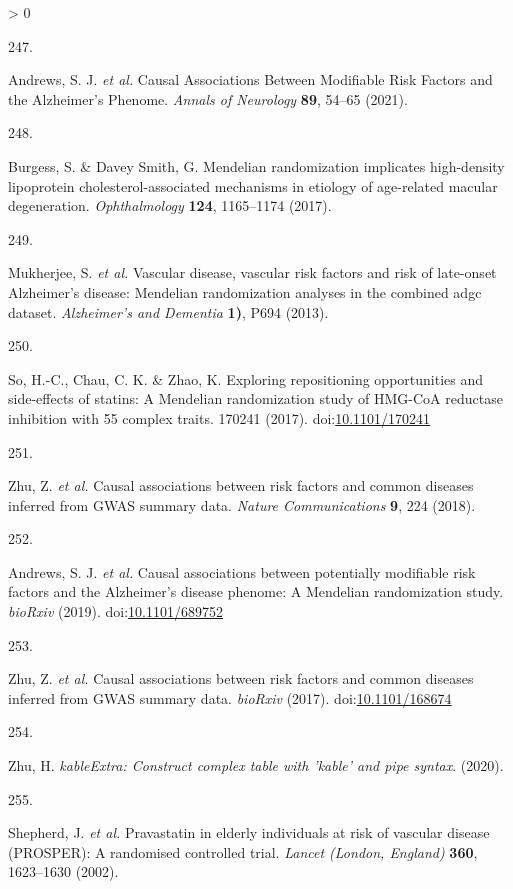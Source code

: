 \documentclass[a4paper, twoside]{templates/ociamthesis}
\newlength{\cslhangindent}
\newlength{\csllabelwidth}
\newenvironment{CSLReferences}[3] %
 {%
  \setlength{\parindent}{0pt}
  \ifodd #1 \everypar{\setlength{\hangindent}{\cslhangindent}}\ignorespaces\fi
  \ifnum #2 > 0
  \setlength{\parskip}{#2\baselineskip}
  \fi
 }%
 {}
\newcommand{\CSLLeftMargin}[1]{\parbox[t]{\maxof{\widthof{#1}}{\csllabelwidth}}{#1}}
\newcommand{\CSLRightInline}[1]{\parbox[t]{\linewidth - \csllabelwidth}{#1}}
\begin{document}
\begin{CSLReferences}{0}{0}
\leavevmode\hypertarget{ref-andrews2021}{}%
\CSLLeftMargin{247. }
\CSLRightInline{Andrews, S. J. \emph{et al.} Causal {Associations Between Modifiable Risk Factors} and the {Alzheimer}'s {Phenome}. \emph{Annals of Neurology} \textbf{89}, 54--65 (2021).}

\leavevmode\hypertarget{ref-burgess2017}{}%
\CSLLeftMargin{248. }
\CSLRightInline{Burgess, S. \& Davey Smith, G. Mendelian randomization implicates high-density lipoprotein cholesterol-associated mechanisms in etiology of age-related macular degeneration. \emph{Ophthalmology} \textbf{124}, 1165--1174 (2017).}

\leavevmode\hypertarget{ref-mukherjee2013}{}%
\CSLLeftMargin{249. }
\CSLRightInline{Mukherjee, S. \emph{et al.} Vascular disease, vascular risk factors and risk of late-onset {Alzheimer}'s disease: Mendelian randomization analyses in the combined adgc dataset. \emph{Alzheimer's and Dementia} \textbf{1)}, P694 (2013).}

\leavevmode\hypertarget{ref-so2017}{}%
\CSLLeftMargin{250. }
\CSLRightInline{So, H.-C., Chau, C. K. \& Zhao, K. Exploring repositioning opportunities and side-effects of statins: A {Mendelian} randomization study of {HMG}-{CoA} reductase inhibition with 55 complex traits. 170241 (2017). doi:\href{https://doi.org/10.1101/170241}{10.1101/170241}}

\leavevmode\hypertarget{ref-zhu2018}{}%
\CSLLeftMargin{251. }
\CSLRightInline{Zhu, Z. \emph{et al.} Causal associations between risk factors and common diseases inferred from {GWAS} summary data. \emph{Nature Communications} \textbf{9}, 224 (2018).}

\leavevmode\hypertarget{ref-andrews2019}{}%
\CSLLeftMargin{252. }
\CSLRightInline{Andrews, S. J. \emph{et al.} Causal associations between potentially modifiable risk factors and the {Alzheimer}'s disease phenome: A {Mendelian} randomization study. \emph{bioRxiv} (2019). doi:\href{https://doi.org/10.1101/689752}{10.1101/689752}}

\leavevmode\hypertarget{ref-zhu2017}{}%
\CSLLeftMargin{253. }
\CSLRightInline{Zhu, Z. \emph{et al.} Causal associations between risk factors and common diseases inferred from {GWAS} summary data. \emph{bioRxiv} (2017). doi:\href{https://doi.org/10.1101/168674}{10.1101/168674}}

\leavevmode\hypertarget{ref-zhu2020}{}%
\CSLLeftMargin{254. }
\CSLRightInline{Zhu, H. \emph{{kableExtra}: Construct complex table with 'kable' and pipe syntax}. (2020).}

\leavevmode\hypertarget{ref-shepherd2002}{}%
\CSLLeftMargin{255. }
\CSLRightInline{Shepherd, J. \emph{et al.} Pravastatin in elderly individuals at risk of vascular disease ({PROSPER}): A randomised controlled trial. \emph{Lancet (London, England)} \textbf{360}, 1623--1630 (2002).}


\end{CSLReferences}
\end{document}

